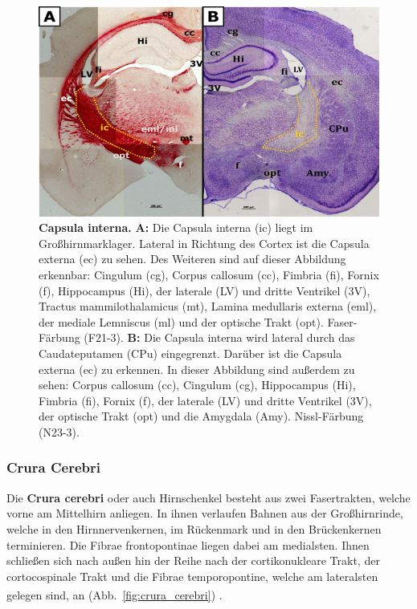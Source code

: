\begin{figure}[H]
    \centering
    \includegraphics[width=\textwidth]{pictures/Bilder_Laura/internal_capsule_F21_3P_025x_N23_3P_025x.png}
    \caption[Capsula interna]{\textbf{Capsula interna.} \textbf{A:} Die Capsula interna (ic) liegt im Großhirnmarklager. Lateral in Richtung des Cortex ist die Capsula externa (ec) zu sehen. Des Weiteren sind auf dieser Abbildung erkennbar: Cingulum (cg), Corpus callosum (cc), Fimbria (fi), Fornix (f), Hippocampus (Hi), der laterale (LV) und dritte Ventrikel (3V), Tractus mammilothalamicus (mt), Lamina medullaris externa (eml), der mediale Lemniscus (ml) und der optische Trakt (opt). Faser-Färbung (F21-3). \textbf{B:} Die Capsula interna wird lateral durch das Caudateputamen (CPu) eingegrenzt. Darüber ist die Capsula externa (ec) zu erkennen. In dieser Abbildung sind außerdem zu sehen: Corpus callosum (cc), Cingulum (cg), Hippocampus (Hi), Fimbria (fi), Fornix (f), der laterale (LV) und dritte Ventrikel (3V), der optische Trakt (opt) und die Amygdala (Amy). Nissl-Färbung (N23-3).}
    \label{fig:Capsula_interna}
\end{figure}


\subsubsection*{Crura Cerebri} 
Die \textbf{Crura cerebri} oder auch Hirnschenkel besteht aus zwei Fasertrakten, welche vorne am Mittelhirn anliegen. In ihnen verlaufen Bahnen aus der Großhirnrinde, welche in den Hirnnervenkernen, im Rückenmark und in den Brückenkernen terminieren. Die Fibrae frontopontinae liegen dabei am medialsten. Ihnen schließen sich nach außen hin der Reihe nach der cortikonukleare Trakt, der cortocospinale Trakt und die Fibrae temporopontine, welche am lateralsten gelegen sind, an (Abb.~\ref{fig:crura_cerebri}) \textsuperscript{\cite[6]{trepel2011neuroanatomie}}.

